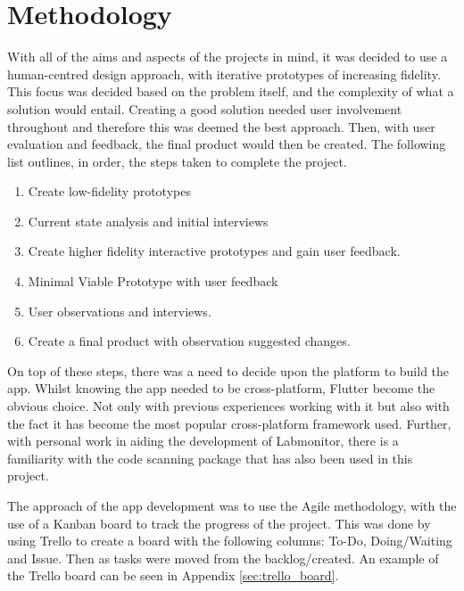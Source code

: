 \documentclass [11pt,a4paper]{article}
\begin{document}
\section{Methodology}
\label{sec:methodology}

With all of the aims and aspects of the projects in mind, it was decided to use a human-centred design approach, with iterative prototypes of increasing fidelity. This focus was decided based on the problem itself, and the complexity of what a solution would entail. Creating a good solution needed user involvement throughout and therefore this was deemed the best approach. Then, with user evaluation and feedback, the final product would then be created. The following list outlines, in order, the steps taken to complete the project.

\begin{enumerate}[noitemsep]
    \item Create low-fidelity prototypes
    \item Current state analysis and initial interviews
    \item Create higher fidelity interactive prototypes and gain user feedback.
    \item Minimal Viable Prototype with user feedback
    \item User observations and interviews.
    \item Create a final product with observation suggested changes.
\end{enumerate}

On top of these steps, there was a need to decide upon the platform to build the app. Whilst knowing the app needed to be cross-platform, Flutter become the obvious choice. Not only with previous experiences working with it but also with the fact it has become the most popular cross-platform framework \cite{JetBrainsFlutter} used. Further, with personal work in aiding the development of Labmonitor\cite{labmonitor}, there is a familiarity with the code scanning package that has also been used in this project\cite{barcodeScannerPlugin}.

The approach of the app development was to use the Agile methodology, with the use of a Kanban board to track the progress of the project. This was done by using Trello to create a board with the following columns: To-Do, Doing/Waiting and Issue. Then as tasks were moved from the backlog/created. An example of the Trello board can be seen in Appendix \ref{sec:trello_board}.

\pagebreak
\end{document}
